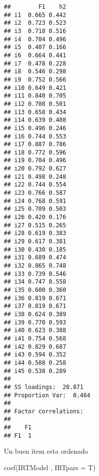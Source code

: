 \documentclass[
]{article}
\newenvironment{Shaded}{\begin{snugshade}}{\end{snugshade}}
\newcommand{\AttributeTok}[1]{\textcolor[rgb]{0.77,0.63,0.00}{#1}}
\newcommand{\FunctionTok}[1]{\textcolor[rgb]{0.00,0.00,0.00}{#1}}
\newcommand{\NormalTok}[1]{#1}
\begin{document}
\begin{verbatim}
##        F1    h2
## i1  0.665 0.442
## i2  0.723 0.523
## i3  0.718 0.516
## i4  0.704 0.496
## i5  0.407 0.166
## i6  0.664 0.441
## i7  0.478 0.228
## i8  0.546 0.298
## i9  0.752 0.566
## i10 0.649 0.421
## i11 0.840 0.705
## i12 0.708 0.501
## i13 0.658 0.434
## i14 0.639 0.408
## i15 0.496 0.246
## i16 0.744 0.553
## i17 0.887 0.786
## i18 0.772 0.596
## i19 0.704 0.496
## i20 0.792 0.627
## i21 0.498 0.248
## i22 0.744 0.554
## i23 0.766 0.587
## i24 0.768 0.591
## i25 0.709 0.503
## i26 0.420 0.176
## i27 0.515 0.265
## i28 0.619 0.383
## i29 0.617 0.381
## i30 0.430 0.185
## i31 0.689 0.474
## i32 0.865 0.748
## i33 0.739 0.546
## i34 0.747 0.558
## i35 0.600 0.360
## i36 0.819 0.671
## i37 0.819 0.671
## i38 0.624 0.389
## i39 0.770 0.593
## i40 0.623 0.388
## i41 0.754 0.568
## i42 0.829 0.687
## i43 0.594 0.352
## i44 0.508 0.258
## i45 0.538 0.289
## 
## SS loadings:  20.871 
## Proportion Var:  0.464 
## 
## Factor correlations: 
## 
##    F1
## F1  1
\end{verbatim}

Un buen item esta ordenado

\begin{Shaded}
\begin{Highlighting}[]
\FunctionTok{coef}\NormalTok{(IRTModel , }\AttributeTok{IRTpars =}\NormalTok{ T)}
\end{Highlighting}
\end{Shaded}
\end{document}
